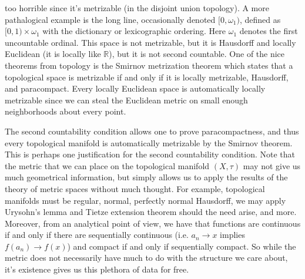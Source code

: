         too horrible since it's metrizable (in the disjoint union topology). A
        more pathalogical example is the long line, occasionally denoted
        $[0,\omega_{1})$, defined as $[0,1)\times\omega_{1}$ with the dictionary
        or lexicographic ordering. Here $\omega_{1}$ denotes the first
        uncountable ordinal. This space is not metrizable, but it is Hausdorff
        and locally Euclidean (it is locally like $\mathbb{R}$), but it is
        not second countable. One of the nice theorems from topology is the
        Smirnov metrization theorem which states that a topological space is
        metrizable if and only if it is locally metrizable, Hausdorff, and
        paracompact. Every locally Euclidean space is automatically locally
        metrizable since we can steal the Euclidean metric on small enough
        neighborhoods about every point.
        \par\hfill\par
        The second countability condition allows one to prove paracompactness,
        and thus every topological manifold is automatically metrizable by the
        Smirnov theorem. This is perhaps one justification for the second
        countability condition. Note that the metric that we can place on the
        topological manifold $(X,\tau)$ may not give us much geometrical
        information, but simply allows us to apply the results of the theory of
        metric spaces without much thought. For example, topological manifolds
        must be regular, normal, perfectly normal Hausdorff, we may apply
        Urysohn's lemma and Tietze extension theorem should the need arise, and
        more. Moreover, from an analytical point of view, we have that functions
        are continuous if and only if there are sequentially continuous (i.e.
        $a_{n}\rightarrow{x}$ implies $f(a_{n})\rightarrow{f}(x)$) and compact
        if and only if sequentially compact. So while the metric does not
        necessarily have much to do with the structure we care about, it's
        existence gives us this plethora of data for free.
